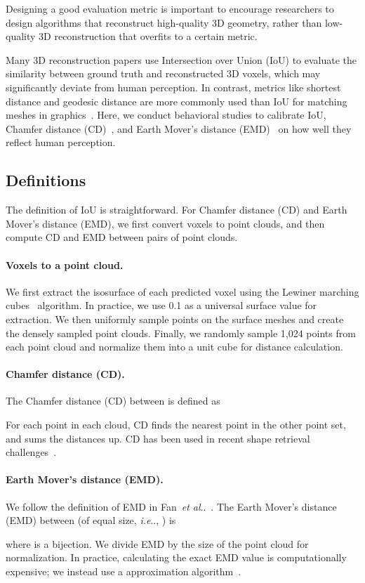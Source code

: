 \documentclass[10pt,twocolumn,letterpaper]{article}
\makeatletter
\DeclareRobustCommand\onedot{\futurelet\@let@token\@onedot}
\def\@onedot{\ifx\@let@token.\else.\null\fi\xspace}
\def\ie{\emph{i.e}\onedot} \def\Ie{\emph{I.e}\onedot}
\def\etal{\emph{et al}\onedot}
\newcommand{\myparagraph}[1]{\vspace{-14pt}\paragraph{#1}}
\makeatother
\begin{document}
Designing a good evaluation metric is important to encourage researchers to design algorithms that reconstruct high-quality 3D geometry, rather than low-quality 3D reconstruction that overfits to a certain metric.

Many 3D reconstruction papers use Intersection over Union (IoU) to evaluate the similarity between ground truth and reconstructed 3D voxels, which may significantly deviate from human perception. In contrast, metrics like shortest distance and geodesic distance are more commonly used than IoU for matching meshes in graphics~\cite{kreavoy2007model,jain2006robust}. Here, we conduct behavioral studies to calibrate IoU, Chamfer distance (CD)~\cite{barrow1977parametric}, and Earth Mover's distance (EMD)~\cite{rubner2000earth} on how well they reflect human perception.

\subsection{Definitions}

The definition of IoU is straightforward. For Chamfer distance (CD) and Earth Mover's distance (EMD), we first convert voxels to point clouds, and then compute  CD and EMD between pairs of point clouds. 

\myparagraph{Voxels to a point cloud.} We first extract the isosurface of each predicted voxel using the Lewiner marching cubes~\cite{Lewiner03} algorithm. In practice, we use 0.1 as a universal surface value for extraction. We then uniformly sample points on the surface meshes and create the densely sampled point clouds. Finally, we randomly sample 1,024 points from each point cloud and normalize them into a unit cube for distance calculation. 

\myparagraph{Chamfer distance (CD).} The Chamfer distance (CD) between  is defined as

For each point in each cloud, CD finds the nearest point in the other point set, and sums the distances up. CD has been used in recent shape retrieval challenges~\cite{yi2017large}. 

\myparagraph{Earth Mover's distance (EMD).}  We follow the definition of EMD in Fan~\etal~\cite{fan2017point}. The Earth Mover's distance (EMD) between  (of equal size, \ie, ) is

where  is a bijection. We divide EMD by the size of the point cloud for normalization. In practice, calculating the exact EMD value is computationally expensive; we instead use a  approximation algorithm~\cite{bertsekas1985distributed}. 
\end{document}
